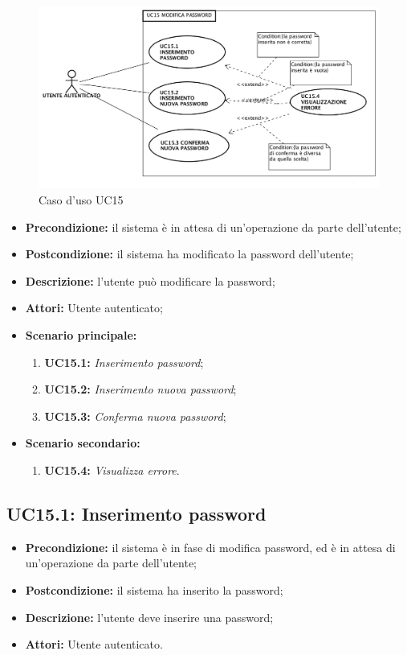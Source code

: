 \begin{figure}[h]
	\begin{center}
	\includegraphics[scale=0.4]{diagram/UC15.png}
	\caption{Caso d'uso UC15}
	\end{center}
\end{figure}
\begin{itemize}
	\item \textbf{Precondizione:} il sistema è in attesa di un'operazione da parte dell'utente;
	\item \textbf{Postcondizione:} il sistema ha modificato la password dell'utente;
	\item \textbf{Descrizione:} l'utente può modificare la password;
	\item \textbf{Attori:} Utente autenticato;
	\item \textbf{Scenario principale:}
	\begin{enumerate}
		\item \textbf{ UC15.1:} \textit{ Inserimento password};
		\item \textbf{ UC15.2:} \textit{ Inserimento nuova password};
		\item \textbf{ UC15.3:} \textit{ Conferma nuova password};
	\end{enumerate}
	\item \textbf{Scenario secondario:}
	\begin{enumerate}
		\item \textbf{ UC15.4:} \textit{ Visualizza errore}.
	\end{enumerate}
\end{itemize}
\subsection{ UC15.1: Inserimento password}

\begin{itemize}
	\item \textbf{Precondizione:} il sistema è in fase di modifica password, ed è in attesa di un'operazione da parte dell'utente;
	\item \textbf{Postcondizione:} il sistema ha inserito la password;
	\item \textbf{Descrizione:} l'utente deve inserire una password;
	\item \textbf{Attori:} Utente autenticato.
\end{itemize}
